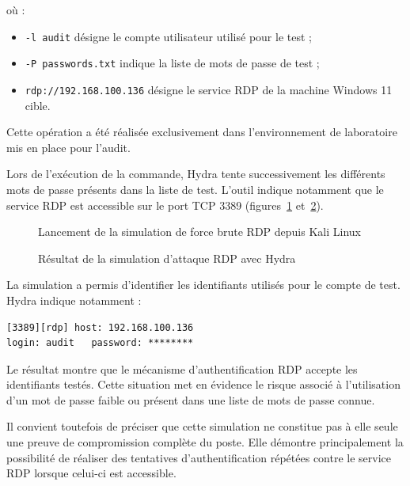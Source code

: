 où :
\begin{itemize}
  \item \texttt{-l audit} désigne le compte utilisateur utilisé pour le test ;
  \item \texttt{-P passwords.txt} indique la liste de mots de passe de test ;
  \item \texttt{rdp://192.168.100.136} désigne le service RDP de la machine Windows 11 cible.
\end{itemize}
Cette opération a été réalisée exclusivement dans l'environnement de laboratoire mis en place pour l'audit.

Lors de l'exécution de la commande, Hydra tente successivement les différents mots de passe présents dans la liste de test. L'outil indique notamment que le service RDP est accessible sur le port TCP 3389 (figures~\ref{fig:hydra-launch} et~\ref{fig:hydra-result}).

\begin{figure}[htbp]
\centering
{}
\caption{Lancement de la simulation de force brute RDP depuis Kali Linux}
\label{fig:hydra-launch}
\end{figure}

\begin{figure}[htbp]
\centering
{}
\caption{Résultat de la simulation d'attaque RDP avec Hydra}
\label{fig:hydra-result}
\end{figure}

La simulation a permis d'identifier les identifiants utilisés pour le compte de test. Hydra indique notamment :

\begin{lstlisting}
[3389][rdp] host: 192.168.100.136
login: audit   password: ********
\end{lstlisting}

Le résultat montre que le mécanisme d'authentification RDP accepte les identifiants testés. Cette situation met en évidence le risque associé à l'utilisation d'un mot de passe faible ou présent dans une liste de mots de passe connue.

Il convient toutefois de préciser que cette simulation ne constitue pas à elle seule une preuve de compromission complète du poste. Elle démontre principalement la possibilité de réaliser des tentatives d'authentification répétées contre le service RDP lorsque celui-ci est accessible.

